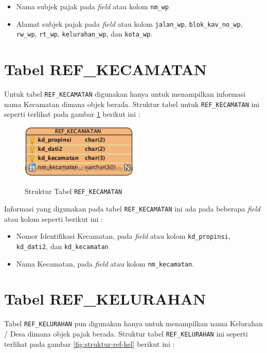 \begin{itemize}
	\item Nama subjek pajak pada \textit{field} atau kolom \texttt{nm\_wp}
	\item Alamat subjek pajak pada \textit{field} atau kolom \texttt{jalan\_wp}, \texttt{blok\_kav\_no\_wp}, \texttt{rw\_wp}, \texttt{rt\_wp}, \texttt{kelurahan\_wp}, dan \texttt{kota\_wp}.
\end{itemize}

\section{Tabel REF\_KECAMATAN}

Untuk tabel \texttt{REF\_KECAMATAN} digunakan hanya untuk menampilkan informasi nama Kecamatan dimana objek berada. Struktur tabel untuk \texttt{REF\_KECAMATAN} ini seperti terlihat pada gambar \ref{fig:struktur-ref-kec} berikut ini :

\begin{figure}[H]
	\centering
	\includegraphics[width=0.5\textwidth]{./resources/struktur-tabel-ref-kec}
	\label{fig:struktur-ref-kec}
	\caption{Struktur Tabel \texttt{REF\_KECAMATAN}}
\end{figure}

Informasi yang digunakan pada tabel \texttt{REF\_KECAMATAN} ini ada pada beberapa \textit{field} atau kolom seperti berikut ini :

\begin{itemize}
	\item Nomor Identifikasi Kecamatan, pada \textit{field} atau kolom \texttt{kd\_propinsi}, \texttt{kd\_dati2}, dan \texttt{kd\_kecamatan}
	\item Nama Kecamatan, pada \textit{field} atau kolom \texttt{nm\_kecamatan}.
\end{itemize}

\section{Tabel REF\_KELURAHAN}

Tabel \texttt{REF\_KELURAHAN} pun digunakan hanya untuk menampilkan nama Kelurahan / Desa dimana objek pajak berada. Struktur tabel \texttt{REF\_KELURAHAN} ini seperti terlihat pada gambar \ref{fig:struktur-ref-kel} berikut ini :

